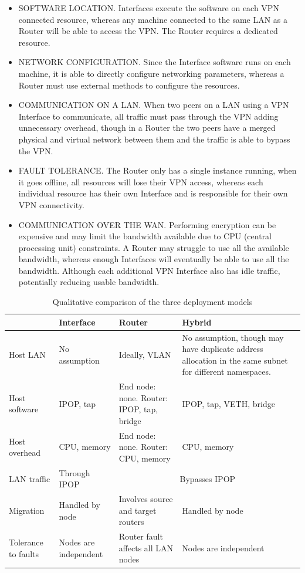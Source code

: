 \begin{itemize}

\item SOFTWARE LOCATION. Interfaces execute the software on each VPN connected
resource, whereas any machine connected to the same LAN as a Router will be
able to access the VPN.  The Router requires a dedicated resource.

\item NETWORK CONFIGURATION. Since the Interface software runs on each machine,
it is able to directly configure networking parameters, whereas a Router must
use external methods to configure the resources.

\item COMMUNICATION ON A LAN. When two peers on a LAN using a VPN Interface to
communicate, all traffic must pass through the VPN adding unnecessary overhead,
though in a Router the two peers have a merged physical and virtual network
between them and the traffic is able to bypass the VPN.

\item FAULT TOLERANCE. The Router only has a single instance running, when it
goes offline, all resources will lose their VPN access, whereas each individual
resource has their own Interface and is responsible for their own VPN
connectivity.

\item COMMUNICATION OVER THE WAN. Performing encryption can be expensive and
may limit the bandwidth available due to CPU (central processing unit)
constraints.  A Router may struggle to use all the available bandwidth, whereas
enough Interfaces will eventually be able to use all the bandwidth.  Although
each additional VPN Interface also has idle traffic, potentially reducing
usable bandwidth.

\end{itemize}

\begin{table}
\caption{Qualitative comparison of the three deployment models}
\label{tab:three_models}
\centering
\begin{tabular}{p{.95in}p{1.25in}p{1.5in}p{2.2in}} \hline
 & Interface & Router & Hybrid \\ \hline \hline
Host LAN 
& 
No assumption 
& 
Ideally, VLAN
&
No assumption, though may have duplicate address allocation in the same subnet
for different namespaces.\footnotemark[2]
\\ \hline
Host software
&
IPOP, tap
&
End node: none. Router: IPOP, tap, bridge 
&
IPOP, tap, VETH, bridge \\ \hline
Host overhead
&
CPU, memory
& 
End node: none. Router: CPU, memory
&
CPU, memory \\ \hline
LAN traffic
&
Through IPOP
&
\multicolumn{2}{c|}{Bypasses IPOP} \\ \hline
Migration
&
Handled by node
&
Involves source and target routers
&
Handled by node \\ \hline
Tolerance to faults
&
Nodes are independent
&
Router fault affects all LAN nodes
&
Nodes are independent \\ \hline
\end{tabular}
\end{table}

